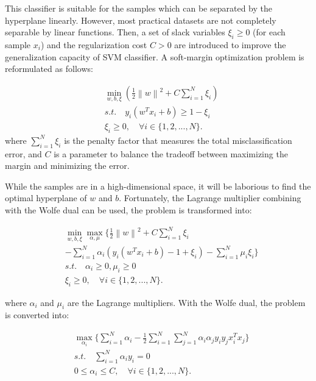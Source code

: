 This classifier is suitable for the samples which can be separated by the hyperplane linearly. However, most practical datasets are not completely separable by linear functions. Then, a set of slack variables $\xi_i\ge 0$ (for each sample $x_i$) and the regularization cost $C>0$ are introduced to improve the generalization capacity of SVM classifier. A soft-margin optimization problem is reformulated as follows:

\begin{equation}
	\begin{split}
		& \mathop{\min}\limits_{w,b,\xi}(\frac{1}{2}{\left \|w \right \|}^{2}+C\sum\limits_{i=1}^N\xi_i)\\
		& s.t. \quad y_i(w^Tx_i+b)\ge 1-\xi_i\\
		&\xi_i \ge 0,\quad\forall i\in \{1,2,...,N\}.
	\end{split}
\end{equation}
where $\sum\limits_{i=1}^N\xi_i$ is the penalty factor that measures the total misclassification error, and $C$ is a parameter to balance the tradeoff between maximizing the margin and minimizing the error.

While the samples are in a high-dimensional space, it will be laborious to find the optimal hyperplane of $w$ and $b$. Fortunately, the Lagrange multiplier combining with the Wolfe dual can be used, the problem is transformed into:

\begin{equation}
	\begin{split}
		&\mathop{\min}\limits_{w,b,\xi}\mathop{\max}\limits_{\alpha,\mu}\{\frac{1}{2}{\left \|w \right \|}^{2}+C\sum\limits_{i=1}^N\xi_i\\
		&-\sum\limits_{i=1}^N\alpha_i(y_i(w^Tx_i+b)-1+\xi_i)-\sum\limits_{i=1}^N\mu_i\xi_i\}\\
		& s.t. \quad \alpha_i\ge0,\mu_i\ge0\\
		&\xi_i \ge 0,\quad\forall i\in \{1,2,...,N\}.
	\end{split}
\end{equation}

where $\alpha_i$ and $\mu_i$ are the Lagrange multipliers. With the Wolfe dual, the problem is converted into:

\begin{equation}\label{dual}
	\begin{split}
		& \mathop{\max}\limits_{\alpha_i}\{\sum\limits_{i=1}^N\alpha_i
			-\frac{1}{2}\sum\limits_{i=1}^N\sum\limits_{j=1}^N\alpha_i\alpha_jy_iy_jx_i^Tx_j\}\\
		& s.t. \quad \sum\limits_{i=1}^N\alpha_iy_i = 0\\
		&0\le\alpha_i\le C,\quad\forall i\in \{1,2,...,N\}.\\
	\end{split}
\end{equation}

